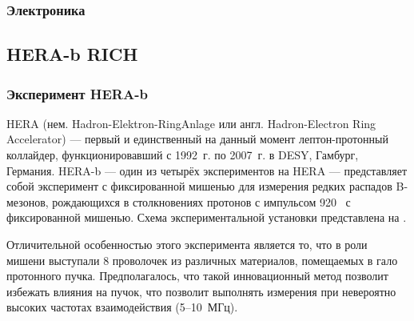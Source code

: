 \subsubsection{Электроника}


\subsection{HERA-b RICH}\label{sec:HerabRich}


\subsubsection{Эксперимент HERA-b}


HERA (нем. Hadron-Elektron-RingAnlage или англ. Hadron-Electron Ring Accelerator) --- первый и единственный на данный момент лептон-протонный коллайдер, функционировавший с 1992~г. по 2007~г. в DESY, Гамбург, Германия. HERA-b --- один из четырёх экспериментов на HERA --- представляет собой эксперимент с фиксированной мишенью для измерения редких распадов B-мезонов, рождающихся в столкновениях протонов с импульсом 920~\GeVoverC{} с фиксированной мишенью.
Схема экспериментальной установки представлена на .

Отличительной особенностью этого эксперимента является то, что в роли мишени выступали 8 проволочек из различных материалов, помещаемых в гало протонного пучка. Предполагалось, что такой инновационный метод позволит избежать влияния на пучок, что позволит выполнять измерения при невероятно высоких частотах взаимодействия (5--10~МГц).
\todo



